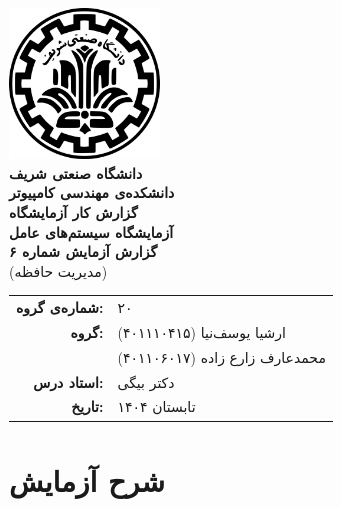 \documentclass[12pt]{article}
\newcommand{\persianordinal}[1]{%
	\ifcase#1
	\or اول%
	\or دوم%
	\or سوم%
	\or چهارم%
	\or پنجم%
	\or ششم%
	\or هفتم%
	\or هشتم%
	\or نهم%
	\or دهم%
	\or یازدهم%
	\or دوازدهم%
	\or سیزدهم%
	\or چهاردهم%
	\or پانزدهم%
	\or شانزدهم%
	\or هفدهم%
	\or هجدهم%
	\or نوزدهم%
	\or بیستم%
	\else #1\fi
}
\newcommand{\persianordinalpage}{\persianfont\persianordinal{\value{page}}}
\begin{document}
	
	\begin{titlepage}
		\centering
		\vspace*{1cm}
		\includegraphics[width=4cm]{sharif.png}\\[1.5cm]
		{\Large\textbf{دانشگاه صنعتی شریف}}\\[0.5cm]
		{\large\textbf{دانشکده‌ی مهندسی کامپیوتر}}\\[1.5cm]
		{\Huge\textbf{گزارش کار آزمایشگاه}}\\[0.5cm]
		{\LARGE\textbf{آزمایشگاه سیستم‌های عامل}}\\[2cm]
		
		\textbf{گزارش آزمایش شماره ۶}\\
		(مدیریت حافظه)
		
		\vfill
		\begin{tabular}{rl}
			\textbf{شماره‌ی گروه:} & ۲۰ \\
			\textbf{گروه:} &
			ارشیا یوسف‌نیا (۴۰۱۱۱۰۴۱۵) \\
			& محمدعارف زارع زاده (۴۰۱۱۰۶۰۱۷) \\
			\textbf{استاد درس:} & دکتر بیگی \\
			\textbf{تاریخ:} & تابستان ۱۴۰۴ \\
		\end{tabular}
	\end{titlepage}
	
	\clearpage
	\setcounter{page}{1}
	\renewcommand{\thepage}{\persianordinalpage}
	
	\tableofcontents
	\clearpage
	\listoffigures
	
	\clearpage
	\setcounter{page}{1}
	\renewcommand{\thepage}{\persianfont\arabic{page}}
	
	
        \section{شرح آزمایش}
\end{document}
